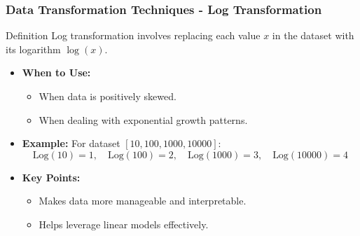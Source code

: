 \documentclass[aspectratio=169]{beamer}
\begin{document}
\begin{frame}[fragile]
    \frametitle{Data Transformation Techniques - Log Transformation}
    \begin{block}{Definition}
        Log transformation involves replacing each value \( x \) in the dataset with its logarithm \( \log(x) \).
    \end{block}
    
    \begin{itemize}
        \item \textbf{When to Use:}
        \begin{itemize}
            \item When data is positively skewed.
            \item When dealing with exponential growth patterns.
        \end{itemize}
        
        \item \textbf{Example:} For dataset \( [10, 100, 1000, 10000] \):
        \[
        \text{Log}(10) = 1, \quad \text{Log}(100) = 2, \quad \text{Log}(1000) = 3, \quad \text{Log}(10000) = 4 
        \]
        \item \textbf{Key Points:}
        \begin{itemize}
            \item Makes data more manageable and interpretable.
            \item Helps leverage linear models effectively.
        \end{itemize}
    \end{itemize}
\end{frame}
\end{document}
